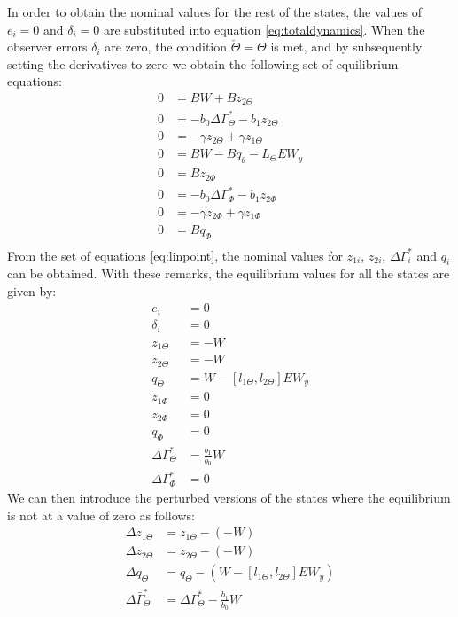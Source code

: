 \documentclass[../main.tex]{subfiles}
\begin{document}
	In order to obtain the nominal values for the rest of the states, the values of $e_i = 0$ and $\delta_i = 0$ are substituted into equation \eqref{eq:totaldynamics}. When the observer errors $\delta_i$ are zero, the condition $\check{\Theta} = \Theta$ is met, and by subsequently setting the derivatives to zero we obtain the following set of equilibrium equations:
	\begin{align}
	0 &= BW + Bz_{2\Theta} \nonumber\\
	0 &= -b_0 \Delta \Gamma_\Theta^{*} - b_1 z_{2\Theta} \nonumber\\
	0 &= -\gamma z_{2\Theta} + \gamma z_{1\Theta}	\nonumber\\
	0 &= BW - Bq_\theta \nonumber - L_\Theta E W_y \\
	0 &=  Bz_{2\Phi}\nonumber \\
	0 &= -b_0 \Delta \Gamma_\Phi^{*} - b_1 z_{2\Phi} \nonumber\\
	0 &= -\gamma z_{2\Phi} + \gamma z_{1\Phi}	\nonumber\\
	0 &= Bq_\Phi \nonumber\\
	\label{eq:linpoint}
	\end{align}
	From the set of equations \eqref{eq:linpoint}, the nominal values for $z_{1i}$, $z_{2i}$, $\Delta \Gamma_i^*$ and $q_i$ can be obtained. With these remarks, the equilibrium values for all the states are given by:
	\begin{align}
		e_i &= 0\nonumber\\
		\delta_i &= 0 \nonumber\\
		z_{1\Theta} &= -W\nonumber\\
		z_{2\Theta} &= -W\nonumber\\
		q_\Theta &= W - [l_{1\Theta}, l_{2\Theta}]E W_y \nonumber\\
		z_{1\Phi} &= 0\nonumber\\
		z_{2\Phi} &= 0\nonumber\\
		q_\Phi &= 0 \nonumber\\
		\Delta \Gamma_\Theta^* &= \frac{b_1}{b_0}W \nonumber\\
		\Delta \Gamma_\Phi^* &= 0 \label{eq:linearizationpoint}
	\end{align}
	We can then introduce the perturbed versions of the states where the equilibrium is not at a value of zero as follows:
	\begin{align}
		\Delta z_{1\Theta} &= z_{1\Theta} - (-W) \nonumber\\
		\Delta z_{2\Theta} &= z_{2\Theta} - (-W) \nonumber\\
		\Delta q_{\Theta} &= q_{\Theta} - (W - [l_{1\Theta}, l_{2\Theta}]E W_y ) \nonumber\\
		\Delta \bar{\Gamma}_{\Theta}^* &= \Delta \Gamma_{\Theta}^* - \frac{b_1}{b_0}W 
	\end{align}
\end{document}
